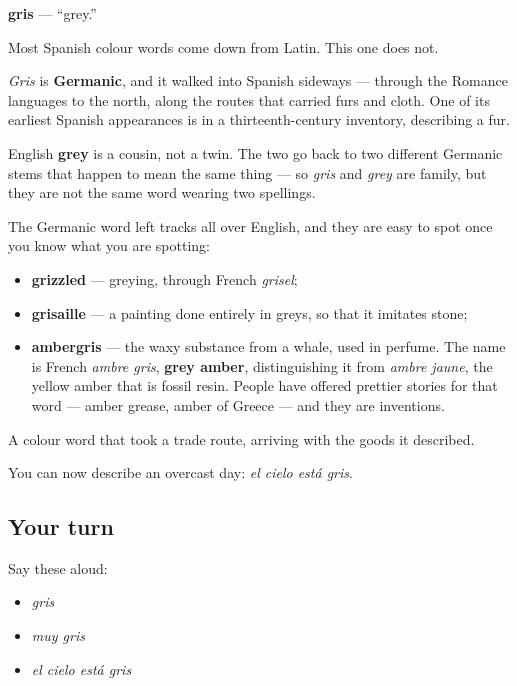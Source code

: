\begin{cousinweb}
\textbf{gris} — \textquotedblleft{}grey.\textquotedblright{}

Most Spanish colour words come down from Latin. This one does not.

\emph{Gris} is \textbf{Germanic}, and it walked into Spanish sideways — through the Romance languages to the north, along the routes that carried furs and cloth. One of its earliest Spanish appearances is in a thirteenth-century inventory, describing a fur.

English \textbf{grey} is a cousin, not a twin. The two go back to two different Germanic stems that happen to mean the same thing — so \emph{gris} and \emph{grey} are family, but they are not the same word wearing two spellings.

The Germanic word left tracks all over English, and they are easy to spot once you know what you are spotting:

\begin{itemize}
\raggedright
  \item \textbf{grizzled} — greying, through French \emph{grisel};
  \item \textbf{grisaille} — a painting done entirely in greys, so that it imitates stone;
  \item \textbf{ambergris} — the waxy substance from a whale, used in perfume. The name is French \emph{ambre gris}, \textbf{grey amber}, distinguishing it from \emph{ambre jaune}, the yellow amber that is fossil resin. People have offered prettier stories for that word — amber grease, amber of Greece — and they are inventions.
\end{itemize}

A colour word that took a trade route, arriving with the goods it described.
\end{cousinweb}

\begin{grammarlens}[title={What you've built}]
You can now describe an overcast day: \emph{el cielo está gris}.
\end{grammarlens}

\subsection*{Your turn}
Say these aloud:

\begin{itemize}
\raggedright
  \item \emph{gris}
  \item \emph{muy gris}
  \item \emph{el cielo está gris}
\end{itemize}

